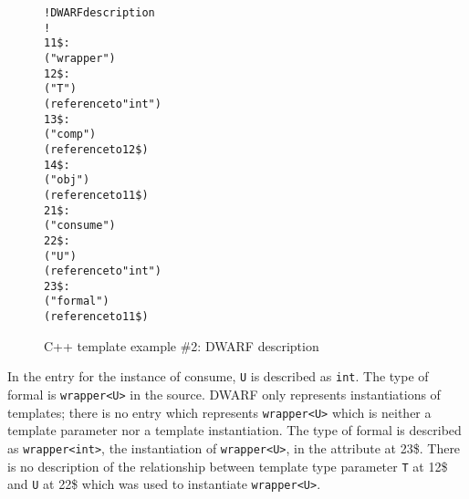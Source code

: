 \begin{figure}[h]
\begin{dwflisting}
\begin{alltt}
! DWARF description
!
11\$:  
          ("wrapper")
12\$:      
              ("T")
              (reference to "int")
13\$:      
              ("comp")
              (reference to 12\$)
14\$:  
          ("obj")
          (reference to 11\$)
21\$:  
          ("consume")
22\$:      
              ("U")
              (reference to "int")
23\$:      
              ("formal")
              (reference to 11\$)
\end{alltt}
\end{dwflisting}
\caption{C++ template example \#2: DWARF description}
\label{fig:ctemplateexample2dwarf}
\end{figure}

In the  
entry for the instance of consume, \texttt{U} is described as \texttt{int}. 
The type of formal is \texttt{wrapper\textless U\textgreater} in
the source. DWARF only represents instantiations of templates;
there is no entry which represents \texttt{wrapper\textless U\textgreater} 
which is neither
a template parameter nor a template instantiation. The type
of formal is described as \texttt{wrapper\textless int\textgreater},
the instantiation of \texttt{wrapper\textless U\textgreater},
in the  attribute at 
23\$. 
There is no
description of the relationship between template type parameter
\texttt{T} at 12\$ and \texttt{U} at 22\$ which was used to instantiate
\texttt{wrapper\textless U\textgreater}.

